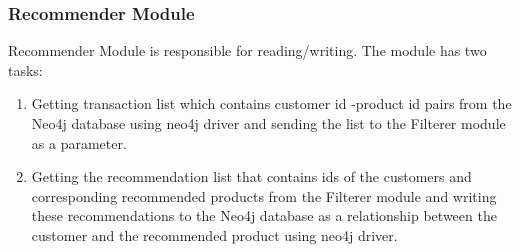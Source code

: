 	\subsubsection{Recommender Module} Recommender Module is responsible for reading/writing. The module has two tasks:
	\begin{enumerate}
		\item Getting transaction list which contains customer id -product id pairs from the Neo4j database using neo4j driver and sending the list to the Filterer module as a parameter.
		\item Getting the recommendation list that contains ids of the customers and corresponding recommended products from the Filterer module and writing these recommendations to the Neo4j database as a relationship between the customer and the recommended product using neo4j driver.
	\end{enumerate}